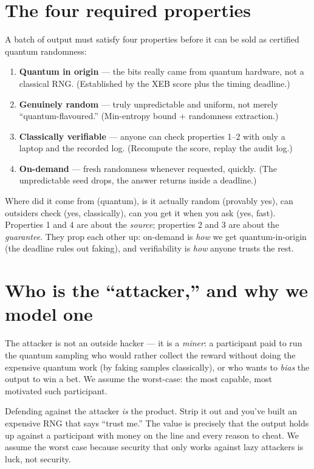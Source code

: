 \documentclass[11pt]{article}
\theoremstyle{definition}
\theoremstyle{plain}
\begin{document}
\section{The four required properties}
A batch of output must satisfy four properties before it can be sold as certified quantum
randomness:
\begin{enumerate}[leftmargin=1.6em,itemsep=2pt]
\item \textbf{Quantum in origin} --- the bits really came from quantum hardware, not a
classical RNG. (Established by the XEB score plus the timing deadline.)
\item \textbf{Genuinely random} --- truly unpredictable and uniform, not merely
``quantum-flavoured.'' (Min-entropy bound $+$ randomness extraction.)
\item \textbf{Classically verifiable} --- anyone can check properties 1--2 with only a
laptop and the recorded log. (Recompute the score, replay the audit log.)
\item \textbf{On-demand} --- fresh randomness whenever requested, quickly. (The
unpredictable seed drops, the answer returns inside a deadline.)
\end{enumerate}

\begin{plain}
Where did it come from (quantum), is it actually random (provably yes), can outsiders
check (yes, classically), can you get it when you ask (yes, fast). Properties 1 and 4 are
about the \emph{source}; properties 2 and 3 are about the \emph{guarantee}. They prop each
other up: on-demand is \emph{how} we get quantum-in-origin (the deadline rules out
faking), and verifiability is \emph{how} anyone trusts the rest.
\end{plain}

\section{Who is the ``attacker,'' and why we model one}
The attacker is not an outside hacker --- it is a \emph{miner}: a participant paid to run
the quantum sampling who would rather collect the reward without doing the expensive
quantum work (by faking samples classically), or who wants to \emph{bias} the output to
win a bet. We assume the worst-case: the most capable, most motivated such participant.

\begin{plain}
Defending against the attacker \emph{is} the product. Strip it out and you've built an
expensive RNG that says ``trust me.'' The value is precisely that the output holds up
against a participant with money on the line and every reason to cheat. We assume the
worst case because security that only works against lazy attackers is luck, not security.
\end{plain}
\end{document}
